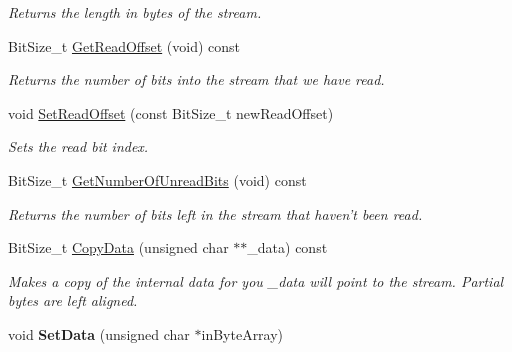 \begin{DoxyCompactItemize}
\begin{DoxyCompactList}\small\item\em Returns the length in bytes of the stream. \end{DoxyCompactList}\item 
\hypertarget{class_rak_net_1_1_bit_stream_ab4fa9312c1d16efd18059e38569c4bb1}{Bit\-Size\-\_\-t \hyperlink{class_rak_net_1_1_bit_stream_ab4fa9312c1d16efd18059e38569c4bb1}{Get\-Read\-Offset} (void) const }\label{class_rak_net_1_1_bit_stream_ab4fa9312c1d16efd18059e38569c4bb1}

\begin{DoxyCompactList}\small\item\em Returns the number of bits into the stream that we have read. \end{DoxyCompactList}\item 
\hypertarget{class_rak_net_1_1_bit_stream_ad7a63454d1e1f26c659c3ebb65bd76ba}{void \hyperlink{class_rak_net_1_1_bit_stream_ad7a63454d1e1f26c659c3ebb65bd76ba}{Set\-Read\-Offset} (const Bit\-Size\-\_\-t new\-Read\-Offset)}\label{class_rak_net_1_1_bit_stream_ad7a63454d1e1f26c659c3ebb65bd76ba}

\begin{DoxyCompactList}\small\item\em Sets the read bit index. \end{DoxyCompactList}\item 
\hypertarget{class_rak_net_1_1_bit_stream_a7a853a0e55000f302b3af27d20ae1dea}{Bit\-Size\-\_\-t \hyperlink{class_rak_net_1_1_bit_stream_a7a853a0e55000f302b3af27d20ae1dea}{Get\-Number\-Of\-Unread\-Bits} (void) const }\label{class_rak_net_1_1_bit_stream_a7a853a0e55000f302b3af27d20ae1dea}

\begin{DoxyCompactList}\small\item\em Returns the number of bits left in the stream that haven't been read. \end{DoxyCompactList}\item 
Bit\-Size\-\_\-t \hyperlink{class_rak_net_1_1_bit_stream_a8471c4c11d6cc08bf713c8f8273d86b0}{Copy\-Data} (unsigned char $\ast$$\ast$\-\_\-data) const 
\begin{DoxyCompactList}\small\item\em Makes a copy of the internal data for you {\itshape \-\_\-data} will point to the stream. Partial bytes are left aligned. \end{DoxyCompactList}\item 
\hypertarget{class_rak_net_1_1_bit_stream_a7724d666af271820e5e779a8ab79fb61}{void {\bfseries Set\-Data} (unsigned char $\ast$in\-Byte\-Array)}\label{class_rak_net_1_1_bit_stream_a7724d666af271820e5e779a8ab79fb61}


\end{DoxyCompactItemize}

